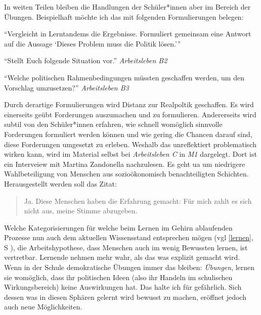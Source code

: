 In weiten Teilen bleiben die Handlungen der Schüler*innen aber im Bereich der Übungen. Beispielhaft möchte ich das mit folgenden Formulierungen belegen:
\begin{myitemize}
    \item \enquote{Vergleicht in Lerntandems die Ergebnisse. Formuliert gemeinsam eine Antwort auf die Aussage \enquote{Dieses Problem muss die Politik lösen.}}

    \item \enquote{Stellt Euch folgende Situation vor.} \emph{Arbeitsleben B2}

    \item \enquote{Welche politischen Rahmenbedingungen müssten geschaffen werden, um den Vorschlag umzusetzen?} \emph{Arbeitsleben B3}
\end{myitemize}
Durch derartige Formulierungen wird Distanz zur Realpoltik geschaffen. Es wird einerseits geübt Forderungen auszumachen und zu formulieren. Andererseits wird subtil von den Schüler*innen erfahren, wie schnell womöglich sinnvolle Forderungen formuliert werden können und wie gering die Chancen darauf sind, diese Forderungen umgesetzt zu erleben. 
Weshalb das unreflektiert problematisch wirken kann, wird im Material selbst bei \emph{Arbeitsleben C} in \emph{M1} dargelegt. Dort ist ein Interveiew mit Martina Zandonella \autocite{Zandonella.2024} nachzulesen. Es geht \gls{ua} um niedrigere Wahlbeteiligung von Menschen aus sozioökonomisch benachteiligten Schichten. Herausgestellt werden soll das Zitat:
\begin{quote}
    Ja. Diese Menschen haben die Erfahrung gemacht: Für mich zahlt es sich nicht aus, meine Stimme abzugeben.   
\end{quote}
Welche Kategorisierungen für welche beim Lernen im Gehirn ablaufenden Prozesse nun auch dem aktuellen Wissensstand entsprechen mögen (\gls{vgl} \ref{lernen}, \gls{S} \pageref{lernen}), die Arbeitshypothese, dass Menschen auch im wenig Bewussten lernen, ist vertretbar. 
Lernende nehmen mehr wahr, als das was explizit gemacht wird. Wenn in der Schule demokratische Übungen immer das bleiben: \emph{Übungen}, lernen sie womöglich, dass ihr politischen Ideen (also ihr Handeln im schulischen Wirkungsbereich) keine Auswirkungen hat. Das halte ich für gefährlich. 
Sich dessen was in diesen Sphären gelernt wird bewusst zu machen, eröffnet jedoch auch neue Möglichkeiten. 


